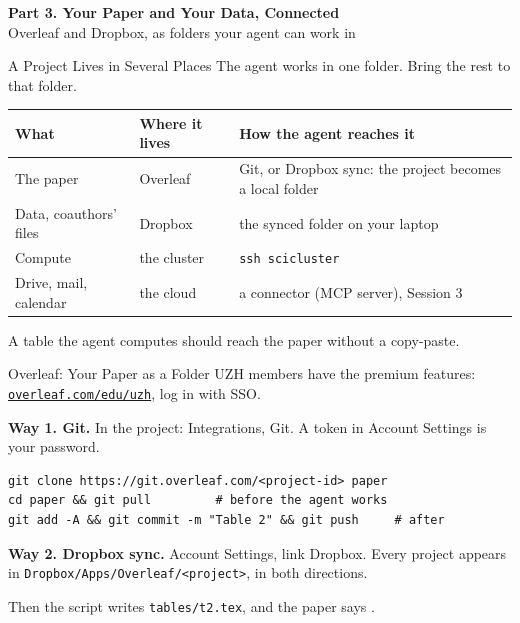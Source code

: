 \documentclass[svgnames,x11names,dvipsnames]{beamer}
\newcommand{\chg}[1]{{\bfseries #1}}
\renewcommand{\chg}[1]{#1}
\newcommand{\sectionslide}[2]{%
\begin{frame}[plain]
  \centering
  \vfill
  {\LARGE \textbf{\textcolor{titleblue}{#1}}}\\[0.4cm]
  {#2}
  \vfill
\end{frame}}
\begin{document}
\sectionslide{Part 3. Your Paper and Your Data, Connected}{Overleaf and Dropbox, as folders your agent can work in}

\begin{frame}{\chg{A Project Lives in Several Places}}
\small
The agent works in one folder. Bring the rest to that folder.

\vspace{0.4cm}
\footnotesize
\renewcommand{\arraystretch}{1.6}
\begin{tabular}{@{}>{\raggedright\arraybackslash}p{2.6cm}>{\raggedright\arraybackslash}p{2.3cm}>{\raggedright\arraybackslash}p{5.3cm}@{}}
\toprule
\textbf{What} & \textbf{Where it lives} & \textbf{How the agent reaches it} \\
\midrule
The paper & Overleaf & Git, or Dropbox sync: the project becomes a local folder \\
Data, coauthors' files & Dropbox & the synced folder on your laptop \\
Compute & the cluster & \texttt{ssh scicluster} \\
Drive, mail, calendar & the cloud & a connector (MCP server), Session 3 \\
\bottomrule
\end{tabular}

\vspace{0.5cm}
\small
\centering
\alert{A table the agent computes should reach the paper without a copy-paste.}
\end{frame}

\begin{frame}[fragile]{\chg{Overleaf: Your Paper as a Folder}}
\small
UZH members have the premium features: \href{https://www.overleaf.com/edu/uzh}{\texttt{overleaf.com/edu/uzh}}, log in with SSO.

\vspace{0.3cm}
\textbf{Way 1. Git.} In the project: Integrations, Git. A token in Account Settings is your password.
{\scriptsize
\begin{verbatim}
git clone https://git.overleaf.com/<project-id> paper
cd paper && git pull         # before the agent works
git add -A && git commit -m "Table 2" && git push     # after
\end{verbatim}}

\vspace{0.2cm}
\textbf{Way 2. Dropbox sync.} Account Settings, link Dropbox. Every project appears in \texttt{Dropbox/Apps/Overleaf/<project>}, in both directions.

\vspace{0.3cm}
Then the script writes \texttt{tables/t2.tex}, and the paper says \verb||.
\end{frame}
\end{document}
